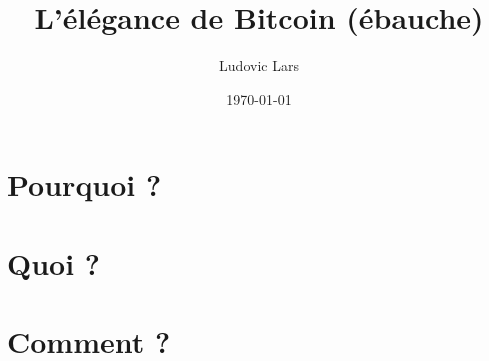 \documentclass[a4paper]{book}
\title{L'élégance de Bitcoin (ébauche)}     %
\author{Ludovic Lars}                       %
\date{\today}                               %
\begin{document}
\maketitle

% 

\mainmatter

\part{Pourquoi ?}





\part{Quoi ?}





\part{Comment ?}





\newpage

\printendnotes*
\end{document}
